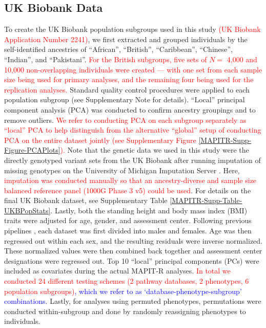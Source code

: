 \documentclass[10pt]{article}
\begin{document}
\subsection*{UK Biobank Data} 

To create the UK Biobank population subgroups used in this study \textcolor{red}{(UK Biobank Application Number 2241)}, we first extracted and grouped individuals by the self-identified ancestries of ``African'', ``British'', ``Caribbean'', ``Chinese'', ``Indian'', and ``Pakistani''. \textcolor{red}{For the British subgroups, five sets of $N =$ 4,000 and 10,000 non-overlapping individuals were created --- with one set from each sample size being used for primary analyses, and the remaining four being used for the replication analyses.} Standard quality control procedures were applied to each population subgroup (see Supplementary Note for details). ``Local'' principal component analysis (PCA) was conducted to confirm ancestry groupings and to remove outliers. \textcolor{red}{We refer to conducting PCA on each subgroup separately as ``local'' PCA to help distinguish from the alternative ``global'' setup of conducting PCA on the entire dataset jointly (see Supplementary Figure \ref{MAPITR-Supp-Figure-PCAPlots}).} Note that the genetic data we used in this study were the directly genotyped variant sets from the UK Biobank after running imputation of missing genotypes on the University of Michigan Imputation Server \cite{Das2016}. Here, \textcolor{red}{imputation was conducted manually so that an ancestry-diverse and sample size balanced reference panel (1000G Phase 3 v5) could be used}. For details on the final UK Biobank dataset, see Supplementary Table \ref{MAPITR-Supp-Table-UKBPopStats}. Lastly, both the standing height and body mass index (BMI) traits were adjusted for age, gender, and assessment center. Following previous pipelines \cite{Wood2014a,Locke2015}, each dataset was first divided into males and females. Age was then regressed out within each sex, and the resulting residuals were inverse normalized. These normalized values were then combined back together and assessment center designations were regressed out. Top 10 ``local'' principal components (PCs) were included as covariates during the actual MAPIT-R analyses. \textcolor{red}{In total we conducted 24 different testing schemes (2 pathway databases, 2 phenotypes, 6 population subgroups)}\textcolor{blue}{, which we refer to as `database-phenotype-subgroup' combinations.} Lastly, for analyses using permuted phenotypes, permutations were conducted within-subgroup and done by randomly reassigning phenotypes to individuals.
\end{document}

